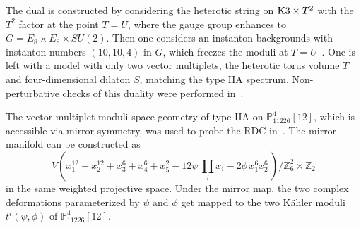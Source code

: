 \documentclass[11pt,a4paper]{article}
\numberwithin{equation}{section}
\numberwithin{table}{section}\setlength{\multlinegap}{25pt}
\begin{document}
The dual is constructed by considering the heterotic string on $\textup{K3}\times T^2$ with the $T^2$ factor at the point $T=U$, where the gauge group enhances to $G=E_8\times E_8\times SU(2)$. Then one considers an instanton backgrounds with instanton numbers $(10,10,4)$ in $G$, which freezes the moduli at $T=U$~\cite{Kachru:1995wm}. One is left with a model with only two vector multiplets, the heterotic torus volume $T$ and four-dimensional dilaton $S$, matching the type IIA spectrum. Non-perturbative checks of this duality were performed in~\cite{Kachru:1995fv}.

The vector multiplet moduli space geometry of type IIA on $\mathbb{P}^4_{11226}[12]$, which is accessible via mirror symmetry, was used to probe the RDC in~\cite{Blumenhagen:2018nts}. The mirror manifold can be constructed as~\cite{Candelas:1993dm}
\begin{equation}
    V\left(x_1^{12}+x_2^{12}+x_3^6+x_4^6+x_5^2-12\psi\,\prod_i x_i-2\phi\, x_1^6 x_2^6\,\right)\Big/\mathbb{Z}_6^2\times\mathbb{Z}_2
\end{equation}
in the same weighted projective space. Under the mirror map, the two complex deformations parameterized by $\psi$ and $\phi$ get mapped to the two Kähler moduli $t^i(\psi,\phi)$ of $\mathbb{P}^4_{11226}[12]$.
\end{document}
